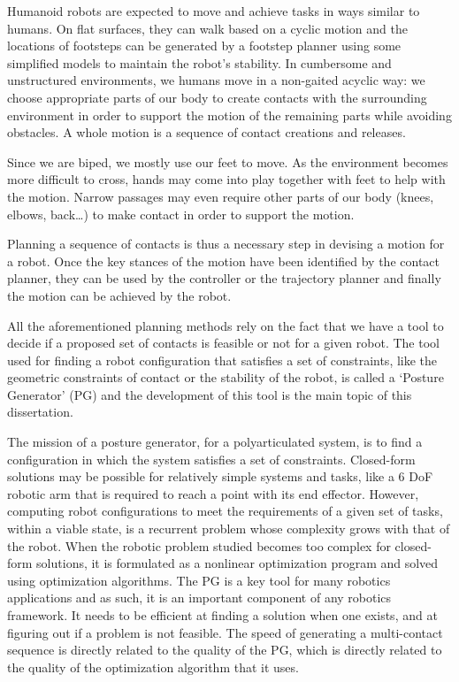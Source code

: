 Humanoid robots are expected to move and achieve tasks in ways similar to humans.
On flat surfaces, they can walk based on a cyclic motion and the locations of footsteps can be generated by a footstep planner using some simplified models to maintain the robot's stability.
In cumbersome and unstructured environments, we humans move in a non-gaited acyclic way: we choose appropriate parts of our body to create contacts with the surrounding environment in order to support the motion of the remaining parts while avoiding obstacles.
A whole motion is a sequence of contact creations and releases.

Since we are biped, we mostly use our feet to move.
As the environment becomes more difficult to cross, hands may come into play together with feet to help with the motion.
Narrow passages may even require other parts of our body (knees, elbows, back\dots) to make contact in order to support the motion.

Planning a sequence of contacts is thus a necessary step in devising a motion for a robot.
Once the key stances of the motion have been identified by the contact planner, they can be used by the controller or the trajectory planner and finally the motion can be achieved by the robot.

All the aforementioned planning methods rely on the fact that we have a tool to decide if a proposed set of contacts is feasible or not for a given robot.
The tool used for finding a robot configuration that satisfies a set of constraints, like the geometric constraints of contact or the stability of the robot, is called a `Posture Generator' (PG) and the development of this tool is the main topic of this dissertation.

The mission of a posture generator, for a polyarticulated system, is to find a configuration in which the system satisfies a set of constraints.
Closed-form solutions may be possible for relatively simple systems and tasks, like a 6 DoF robotic arm that is required to reach a point with its end effector.
However, computing robot configurations to meet the requirements of a given set of tasks, within a viable state, is a recurrent problem whose complexity grows with that of the robot.
When the robotic problem studied becomes too complex for closed-form solutions, it is formulated as a nonlinear optimization program and solved using optimization algorithms.
The PG is a key tool for many robotics applications and as such, it is an important component of any robotics framework.
It needs to be efficient at finding a solution when one exists, and at figuring out if a problem is not feasible.
The speed of generating a multi-contact sequence is directly related to the quality of the PG, which is directly related to the quality of the optimization algorithm that it uses.

